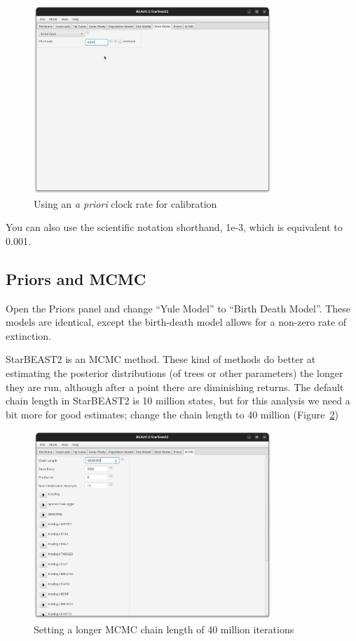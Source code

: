 \documentclass[12pt]{article}
\begin{document}
\begin{figure}[htb!]
\centering
\includegraphics[width=0.8\textwidth]{figures/strictClockModel.png}
\caption
{Using an \textit{a priori} clock rate for calibration}
\label{fig:strictClockModel}
\end{figure}

You can also use the scientific notation shorthand, 1e-3, which is equivalent
to 0.001.

\subsection{Priors and MCMC}
\label{subsec:MCMC}

Open the Priors panel and change ``Yule Model'' to ``Birth Death Model''.
These models are identical, except the birth-death model allows for a
non-zero rate of extinction.

StarBEAST2 is an MCMC method. These kind of methods do better at estimating
the posterior distributions (of trees or other parameters) the longer they
are run, although after a point there are diminishing returns. The default
chain length in StarBEAST2 is 10 million states, but for this analysis we
need a bit more for good estimates; change the chain length to 40 million
(Figure~\ref{fig:chainLength})

\begin{figure}[htb!]
\centering
\includegraphics[width=0.8\textwidth]{figures/chainLength.png}
\caption
{Setting a longer MCMC chain length of 40 million iterations}
\label{fig:chainLength}
\end{figure}
\end{document}
